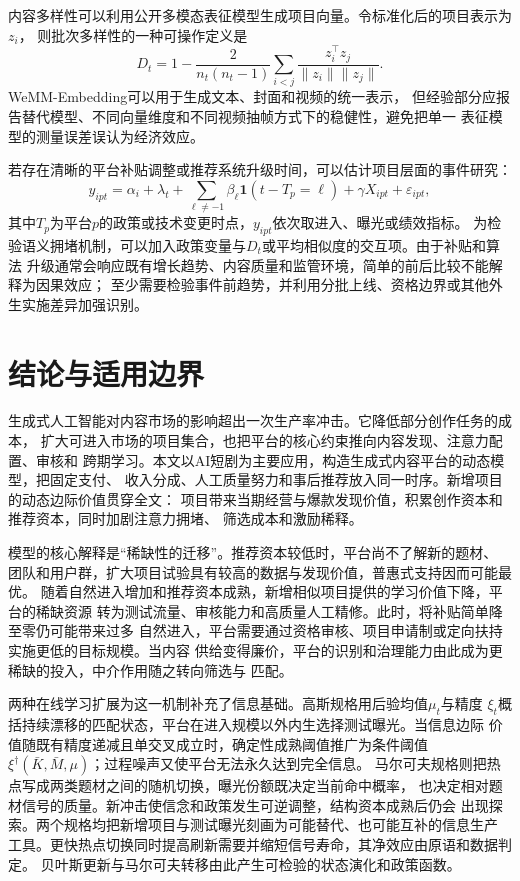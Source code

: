 \documentclass[UTF8, a4paper, 12pt, fontset=fandol]{ctexart}
\theoremstyle{definition}
\theoremstyle{remark}
\newcommand{\ind}[1]{\mathbf{1}(#1)}
\begin{document}
内容多样性可以利用公开多模态表征模型生成项目向量。令标准化后的项目表示为$z_i$，
则批次多样性的一种可操作定义是
\begin{equation}
  D_t
  =1-\frac{2}{n_t(n_t-1)}
  \sum_{i<j}\frac{z_i^\top z_j}{\lVert z_i\rVert\lVert z_j\rVert}.
  \label{eq:经验多样性}
\end{equation}
WeMM-Embedding可以用于生成文本、封面和视频的统一表示\citep{zhou2026wemm}，
但经验部分应报告替代模型、不同向量维度和不同视频抽帧方式下的稳健性，避免把单一
表征模型的测量误差误认为经济效应。

若存在清晰的平台补贴调整或推荐系统升级时间，可以估计项目层面的事件研究：
\begin{equation}
  y_{ipt}
  =\alpha_i+\lambda_t
  +\sum_{\ell\neq-1}\beta_\ell
  \ind{t-T_p=\ell}
  +\gamma X_{ipt}+\varepsilon_{ipt},
  \label{eq:event-study}
\end{equation}
其中$T_p$为平台$p$的政策或技术变更时点，$y_{ipt}$依次取进入、曝光或绩效指标。
为检验语义拥堵机制，可以加入政策变量与$D_t$或平均相似度的交互项。由于补贴和算法
升级通常会响应既有增长趋势、内容质量和监管环境，简单的前后比较不能解释为因果效应；
至少需要检验事件前趋势，并利用分批上线、资格边界或其他外生实施差异加强识别。

\section{结论与适用边界}
\label{sec:conclusion}

生成式人工智能对内容市场的影响超出一次生产率冲击。它降低部分创作任务的成本，
扩大可进入市场的项目集合，也把平台的核心约束推向内容发现、注意力配置、审核和
跨期学习。本文以AI短剧为主要应用，构造生成式内容平台的动态模型，把固定支付、
收入分成、人工质量努力和事后推荐放入同一时序。新增项目的动态边际价值贯穿全文：
项目带来当期经营与爆款发现价值，积累创作资本和推荐资本，同时加剧注意力拥堵、
筛选成本和激励稀释。

模型的核心解释是“稀缺性的迁移”。推荐资本较低时，平台尚不了解新的题材、
团队和用户群，扩大项目试验具有较高的数据与发现价值，普惠式支持因而可能最优。
随着自然进入增加和推荐资本成熟，新增相似项目提供的学习价值下降，平台的稀缺资源
转为测试流量、审核能力和高质量人工精修。此时，将补贴简单降至零仍可能带来过多
自然进入，平台需要通过资格审核、项目申请制或定向扶持实施更低的目标规模。当内容
供给变得廉价，平台的识别和治理能力由此成为更稀缺的投入，中介作用随之转向筛选与
匹配。

两种在线学习扩展为这一机制补充了信息基础。高斯规格用后验均值$\mu_t$与精度
$\xi_t$概括持续漂移的匹配状态，平台在进入规模以外内生选择测试曝光。当信息边际
价值随既有精度递减且单交叉成立时，确定性成熟阈值推广为条件阈值
$\xi^\dagger(\bar K,\bar M,\mu)$；过程噪声又使平台无法永久达到完全信息。
马尔可夫规格则把热点写成两类题材之间的随机切换，曝光份额既决定当前命中概率，
也决定相对题材信号的质量。新冲击使信念和政策发生可逆调整，结构资本成熟后仍会
出现探索。两个规格均把新增项目与测试曝光刻画为可能替代、也可能互补的信息生产
工具。更快热点切换同时提高刷新需要并缩短信号寿命，其净效应由原语和数据判定。
贝叶斯更新与马尔可夫转移由此产生可检验的状态演化和政策函数。
\end{document}
